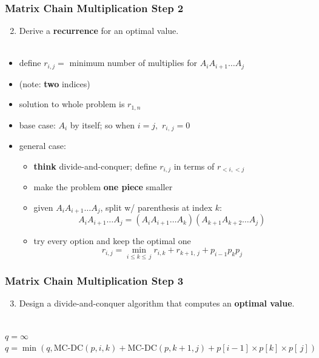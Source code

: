 \documentclass{beamer}
\newcommand{\stanza}{ \\~\ }
\begin{document}
\begin{frame} \frametitle{Matrix Chain Multiplication Step 2}
  \begin{enumerate}
    \setcounter{enumi}{1}
    \item Derive a \textbf{recurrence} for an optimal value.
    \stanza
  \end{enumerate}

  \begin{itemize}
    \item define $r_{i, j} = $ minimum number of multiplies for $A_i A_{i+1} \ldots A_j$
    \item (note: \textbf{two} indices)
    \item solution to whole problem is $r_{1, n}$
    \item base case: $A_i$ by itself; so when $i=j,$ $r_{i,\, j} = 0$
    \item general case:
    \begin{itemize}
      \item \textbf{think} divide-and-conquer; define $r_{i, j}$ in terms of $r_{<i, <j}$
      \item make the problem \textbf{one piece} smaller
      \item given $A_i A_{i+1} \ldots A_j$, split w/ parenthesis at index $k:$
        \[ A_i A_{i+1} \ldots A_j = (A_i A_{i+1} \ldots A_k) (A_{k+1} A_{k+2} \ldots A_j) \]
      \item try every option and keep the optimal one
      \[ r_{i, j} = \min_{i \leq k \leq \, j} r_{i, k} + r_{k+1, \, j} + p_{i-1} p_k p_j \]
    \end{itemize}
  \end{itemize}
\end{frame}
  
\begin{frame} \frametitle{Matrix Chain Multiplication Step 3}
  \begin{enumerate}
    \setcounter{enumi}{2}
    \item Design a divide-and-conquer algorithm that computes an \textbf{optimal value}.
    \stanza
  \end{enumerate}

  {\scriptsize
  \begin{algorithmic}[1]
    \State {}
    \EndFunction
      \State {}
    \EndIf
    \State $q = \infty$
      \State $q = \min(q, \text{MC-DC}(p, i, k) + \text{MC-DC}(p, k+1, j) + p[i-1] \times p[k] \times p[\, j])$
    \EndFor
    \State {}
    \EndFunction
  \end{algorithmic}
  }
\end{frame}
\end{document}
